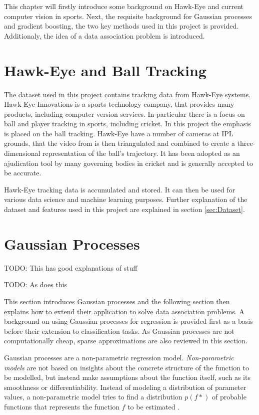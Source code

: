 \documentclass[12pt,a4paper]{report}
\theoremstyle{definition}
\begin{document}
This chapter will firstly introduce some background on Hawk-Eye and current computer vision in sports.
Next, the requisite background for Gaussian processes and gradient boosting, the two key methods used in this project is provided.
Additionaly, the idea of a data association problem is introduced. 

\section{Hawk-Eye and Ball Tracking}

The dataset used in this project contains tracking data from Hawk-Eye systems.
Hawk-Eye Innovations is a sports technology company, that provides many products, including computer version services.
In particular there is a focus on ball and player tracking in sports, including cricket.
In this project the emphasis is placed on the ball tracking.
Hawk-Eye have a number of cameras at IPL grounds, that the video from is then triangulated and combined to create a three-dimensional representation of the ball's trajectory.
It has been adopted as an ajudication tool by many governing bodies in cricket and is generally accepted to be accurate.

Hawk-Eye tracking data is accumulated and stored. 
It can then be used for various data science and machine learning purposes.
Further explanation of the dataset and features used in this project are explained in section \ref{sec:Dataset}.

\section{Gaussian Processes}

\citep{Yi2019} TODO: This has good explanations of stuff

\citep{Griffiths2023} TODO: As does this

This section introduces Gaussian processes and the following section then explains how to extend their application to solve data association problems. 
A background on using Gaussian processes for regression is provided first as a basis before their extension to classification tasks. 
As Gaussian processes are not computationally cheap, sparse approximations are also reviewed in this section.

Gaussian processes are a non-parametric regression model. 
\emph{Non-parametric models} are not based on insights about the concrete structure of the function to be modelled, but instead make assumptions about the function itself, such as its smoothness or differentiability. 
Instead of modeling a distribution of parameter values, a non-parametric model tries to find a distribution $p(f*)$ of probable functions that represents the function $f$ to be estimated \citep{Kaiser2017}.
\end{document}
